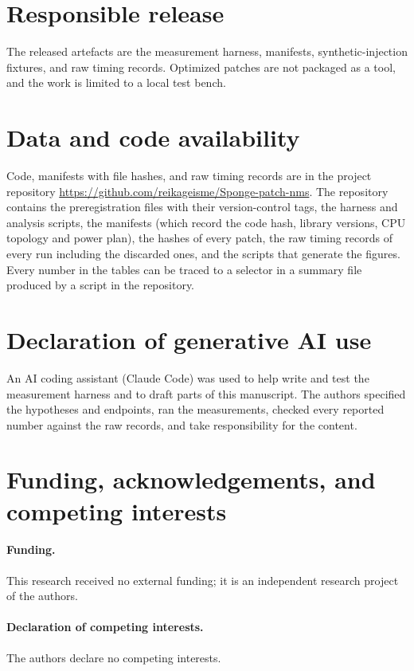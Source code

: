 \documentclass[a4paper,fleqn]{cas-dc}
\begin{document}
\section*{Responsible release}
The released artefacts are the measurement harness, manifests, synthetic-injection fixtures, and raw timing records. Optimized patches are not packaged as a tool, and the work is limited to a local test bench.

\section*{Data and code availability}
Code, manifests with file hashes, and raw timing records are in the project repository \url{https://github.com/reikageisme/Sponge-patch-nms}.
The repository contains the preregistration files with their version-control tags, the harness and analysis scripts, the manifests (which record the code hash, library versions, CPU topology and power plan), the hashes of every patch, the raw timing records of every run including the discarded ones, and the scripts that generate the figures. Every number in the tables can be traced to a selector in a summary file produced by a script in the repository.

\section*{Declaration of generative AI use}
An AI coding assistant (Claude Code) was used to help write and test the measurement harness and to draft parts of this manuscript. The authors specified the hypotheses and endpoints, ran the measurements, checked every reported number against the raw records, and take responsibility for the content.

\section*{Funding, acknowledgements, and competing interests}
\paragraph{Funding.} This research received no external funding; it is an independent research project of the authors.
\paragraph{Declaration of competing interests.} The authors declare no competing interests.



\end{document}

